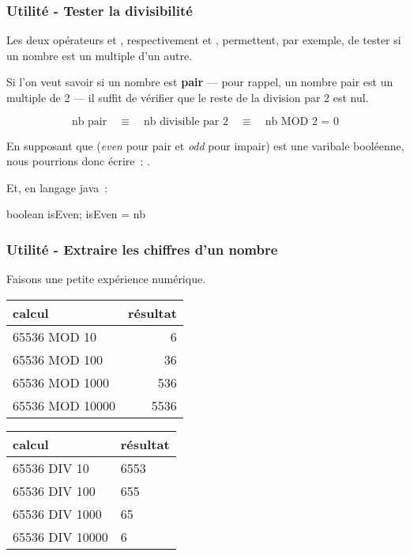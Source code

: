 			
			
		\subsubsection{Utilité - Tester la divisibilité}
		
			Les deux opérateurs  et , respectivement \pc{/} et
			\pc{\%}, permettent, par exemple, de tester si un nombre est un
			multiple d’un autre.

			Si l'on veut savoir si un nombre est \textbf{pair}
			— pour rappel, un nombre pair est un multiple de 2 — il suffit 
			de vérifier que le reste de la division par 2 est nul.
			
			\[
			\textrm{nb pair} 
				\quad\equiv\quad \textrm{nb divisible par 2} 
				\quad\equiv\quad \textrm{nb MOD 2 = 0} 
			\]
			
			En supposant que  (\textit{even} pour pair et \textit{odd}
			pour impair) est une varibale booléenne, nous pourrions donc
			écrire~: .

			Et, en langage java~:

			\begin{java}
boolean isEven;
isEven = nb %
			\end{java}

		\subsubsection{Utilité - Extraire les chiffres d’un nombre}
		
			Faisons une petite expérience numérique.
			\begin{center}
			\begin{tabular}{|l|r|}\hline
				\rowcolor{black!20}
				calcul & résultat \\
				\hline
				65536 MOD 10 & 6 \\  
				65536 MOD 100 & 36 \\  
				65536 MOD 1000 & 536 \\  
				65536 MOD 10000 & 5536 \\ 
				\hline 
			\end{tabular}
			\qquad
			\begin{tabular}{|l|l|}\hline
				\rowcolor{black!20}
				calcul & résultat \\
				\hline
				65536 DIV 10 & 6553 \\  
				65536 DIV 100 & 655 \\  
				65536 DIV 1000 & 65 \\  
				65536 DIV 10000 & 6 \\ 
				\hline 
			\end{tabular}
			\end{center}
		
